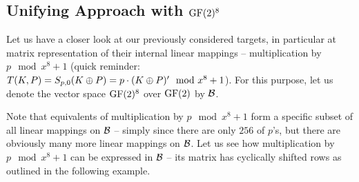 


\subsection{Unifying Approach with $\mathrm{GF}(2)^8$}
\label{sec:unify}

Let us have a closer look at our previously considered targets, in particular at matrix representation of their internal linear mappings -- multiplication by $p\mod{x^8+1}$ (quick reminder: $T(K,P) = S_{p,0}(K\oplus P) = p \cdot (K\oplus P)' \mod{x^8+1}$). For this purpose, let us denote the vector space $\mathrm{GF}(2)^8$ over $\mathrm{GF}(2)$ by $\cal B$.

Note that equivalents of multiplication by $p\mod{x^8+1}$ form a specific subset of all linear mappings on $\cal B$ -- simply since there are only $256$ of $p$'s, but there are obviously many more linear mappings on $\cal B$. Let us see how multiplication by $p\mod{x^8+1}$ can be expressed in $\cal B$ -- its matrix has cyclically shifted rows as outlined in the following example.

